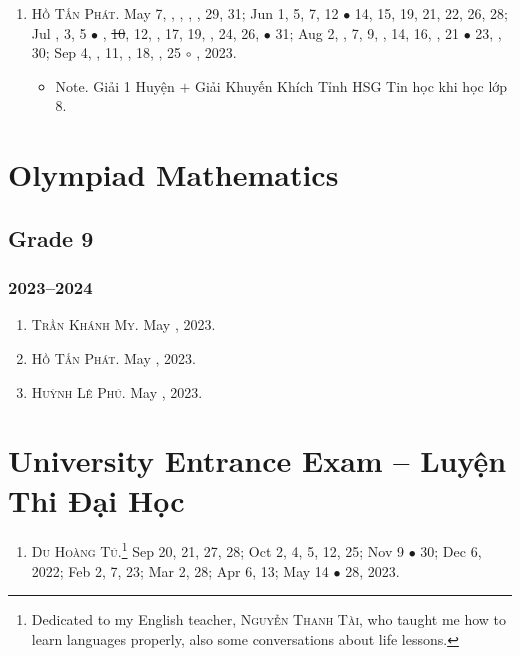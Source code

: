 \documentclass{article}
\begin{document}
\begin{enumerate}
	\item \textsc{Hồ Tấn Phát.} May 7, , , , , 29, 31; Jun 1, 5, 7, 12 $\bullet$ 14, 15, 19, 21, 22, 26, 28; Jul , 3, 5 $\bullet$ , \st{10}, 12, , 17, 19, , 24, 26,  $\bullet$ 31; Aug 2, , 7, 9, , 14, 16, , 21 $\bullet$ 23, , 30; Sep 4, , 11, , 18, , 25 $\circ$ , 2023.
	\begin{itemize}
		\item {\sf Note.} Giải 1 Huyện $+$ Giải Khuyến Khích Tỉnh HSG Tin học khi học lớp 8.
	\end{itemize}
\end{enumerate}


\section{Olympiad Mathematics}

\subsection{Grade 9}

\subsubsection{2023--2024}

\begin{enumerate}
	\item \textsc{Trần Khánh My.} May , 2023.
	\item \textsc{Hồ Tấn Phát.} May , 2023.
	\item \textsc{Huỳnh Lê Phú.} May , 2023.
\end{enumerate}


\section{University Entrance Exam -- Luyện Thi Đại Học}

\begin{enumerate}
	\item \textsc{Du Hoàng Tú.}\footnote{Dedicated to my English teacher, \textsc{Nguyễn Thanh Tài}, who taught me how to learn languages properly, also some conversations about life lessons.} {\sf[In]} Sep 20, 21, 27, 28; Oct 2, 4, 5, 12, 25; Nov 9 $\bullet$ 30; Dec 6, 2022; Feb 2, 7, 23; Mar 2, 28; Apr 6, 13; May 14 $\bullet$ 28, 2023.
\end{enumerate}
\end{document}
